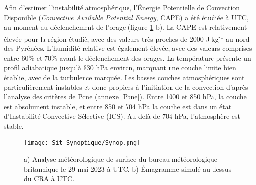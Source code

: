 \documentclass[12pt]{article}
\begin{document}
\begin{multicols}{2}
Afin d'estimer l'instabilité atmosphérique, l’Énergie Potentielle de Convection Disponible (\textit{Convective Available Potential Energy}, CAPE) a été étudiée à  UTC, au moment du déclenchement de l'orage (figure \ref{fig:Synop} b). La CAPE est relativement élevée pour la région étudié, avec des valeurs très proches de 2000 J kg\textsuperscript{-1} au nord des Pyrénées. L'humidité relative est également élevée, avec des valeurs comprises entre $60\%$ et $70\%$ avant le déclenchement des orages. La température présente un profil adiabatique jusqu'à 830 hPa environ, marquant une couche limite bien établie, avec de la turbulence marquée. Les basses couches atmosphériques sont particulièrement instables et donc propices à l'initiation de la convection d'après l'analyse des critères de Pone (annexe \ref{Pone}). Entre 1000 et 850 hPa, la couche est absolument instable, et entre 850 et 704 hPa la couche est dans un état d'Instabilité Convective Sélective (ICS). Au-delà de 704 hPa, l'atmosphère est stable. 

\end{multicols}
\vspace{-5mm}
\begin{figure}[h!]
    \centering
    \texttt{[image: Sit\_Synoptique/Synop.png]}
    \caption{a) Analyse météorologique de surface du bureau météorologique britannique le 29 mai 2023 à \protect{}  UTC. b) Émagramme simulé au-dessus du CRA à \protect{} UTC.}
    \label{fig:Synop}
\end{figure}
\vspace{-5mm}
\end{document}
